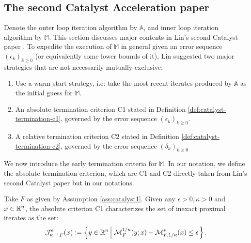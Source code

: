 \documentclass[12pt]{article}
\begin{document}
    \subsection{The second Catalyst Acceleration paper}
        Denote the outer loop iteration algorithm by $\mathbb A$, and inner loop iteration algorithm by $\mathbb M$. 
        This section discusses major contents in Lin's second Catalyst paper \cite{lin_catalyst_2018}. 
        To expedite the execution of $\mathbb M$ in general given an error sequence $(\epsilon_k)_{k \ge 0}$ (or equivalently some lower bounds of it), Lin suggested two major strategies that are not necessarily mutually exclusive: 
        \begin{enumerate}
            \item Use a warm start strategy, i.e: take the most recent iterates produced by $\mathbb A$ as the initial guess for $\mathbb M$. 
            \item An absolute termination criterion C1 stated in Definition \ref{def:catalyst-termination-c1}, governed by the error sequence $(\epsilon_k)_{k \ge 0}$. 
            \item A relative termination criterion C2 stated in Definition \ref{def:catalyst-termination-c2}, governed by the error sequence $(\delta_k)_{k \ge 0}$
        \end{enumerate}
        \par
        We now introduce the early termination criteria for $\mathbb M$. 
        In our notation, we define the absolute termination criterion, which are C1 and C2 directly taken from Lin's second Catalyst paper but in our notations. 
        \begin{definition}\label{def:catalyst-termination-c1}
            Take $F$ as given by Assumption \ref{ass:catalyst1}.
            Given any $\epsilon > 0, \kappa > 0$ and $x \in \mathbb R^n$, the absolute criterion C1 characterizes the set of inexact proximal iterates as the set: 
            \begin{align*}
                \mathcal J_{\kappa^{-1} F}^\epsilon (x) := 
                \left\lbrace
                    y \in \mathbb R^n \left | \; 
                            \mathcal M^{1/\kappa}_F (y; x) - 
                            \mathcal M^*_{F, 1/\kappa}(x) \le \epsilon
                    \right.
                \right\rbrace. 
            \end{align*}
        \end{definition}
\end{document}

